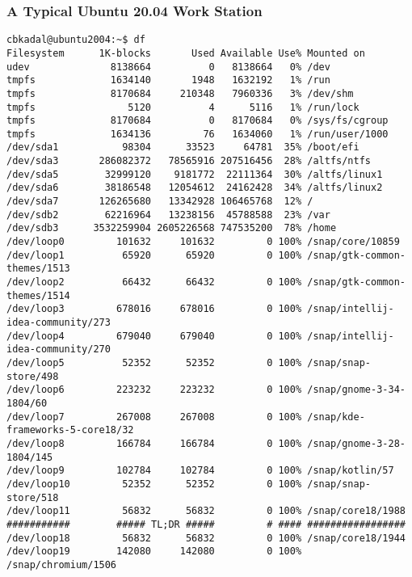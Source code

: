 \documentclass[aspectratio=169, xcolor=table, notheorems, hyperref={pdfpagelabels=false}]{beamer}
\begin{document}
\begin{frame}[fragile]
\frametitle{A Typical Ubuntu 20.04 Work Station}
\begin{lstlisting}[basicstyle=\ttfamily\tiny]
cbkadal@ubuntu2004:~$ df
Filesystem      1K-blocks       Used Available Use% Mounted on
udev              8138664          0   8138664   0% /dev
tmpfs             1634140       1948   1632192   1% /run
tmpfs             8170684     210348   7960336   3% /dev/shm
tmpfs                5120          4      5116   1% /run/lock
tmpfs             8170684          0   8170684   0% /sys/fs/cgroup
tmpfs             1634136         76   1634060   1% /run/user/1000
/dev/sda1           98304      33523     64781  35% /boot/efi
/dev/sda3       286082372   78565916 207516456  28% /altfs/ntfs
/dev/sda5        32999120    9181772  22111364  30% /altfs/linux1
/dev/sda6        38186548   12054612  24162428  34% /altfs/linux2
/dev/sda7       126265680   13342928 106465768  12% /
/dev/sdb2        62216964   13238156  45788588  23% /var
/dev/sdb3      3532259904 2605226568 747535200  78% /home
/dev/loop0         101632     101632         0 100% /snap/core/10859
/dev/loop1          65920      65920         0 100% /snap/gtk-common-themes/1513
/dev/loop2          66432      66432         0 100% /snap/gtk-common-themes/1514
/dev/loop3         678016     678016         0 100% /snap/intellij-idea-community/273
/dev/loop4         679040     679040         0 100% /snap/intellij-idea-community/270
/dev/loop5          52352      52352         0 100% /snap/snap-store/498
/dev/loop6         223232     223232         0 100% /snap/gnome-3-34-1804/60
/dev/loop7         267008     267008         0 100% /snap/kde-frameworks-5-core18/32
/dev/loop8         166784     166784         0 100% /snap/gnome-3-28-1804/145
/dev/loop9         102784     102784         0 100% /snap/kotlin/57
/dev/loop10         52352      52352         0 100% /snap/snap-store/518
/dev/loop11         56832      56832         0 100% /snap/core18/1988
###########        ##### TL;DR #####         # #### #################
/dev/loop18         56832      56832         0 100% /snap/core18/1944
/dev/loop19        142080     142080         0 100% /snap/chromium/1506
\end{lstlisting}
\end{frame}

\end{document}
